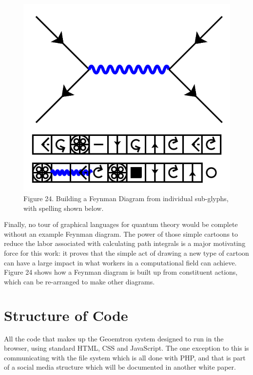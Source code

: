 \documentclass[11pt]{article}
\begin{document}
\begin{figure}

\includegraphics[width=\linewidth]{figures/figure24_feynman1.png}

\caption{Figure 24. Building a Feynman Diagram from individual sub-glyphs, with spelling shown below.}
\end{figure}




    Finally, no tour of graphical languages for quantum theory would be complete without an example Feynman diagram.  The power of those simple cartoons to reduce the labor associated with calculating path integrals is a major motivating force for this work: it proves that the simple act of drawing a new type of cartoon can have a large impact in what workers in a computational field can achieve.  Figure 24 shows how a Feynman diagram is built up from constituent actions, which can be re-arranged to make other diagrams. 

\section{Structure of Code}


    All the code that makes up the Geoemtron system designed to run in the browser, using standard HTML, CSS and JavaScript.  The one exception to this is communicating with the file system which is all done with PHP, and that is part of a social media structure which will be documented in another white paper.  
\end{document}
